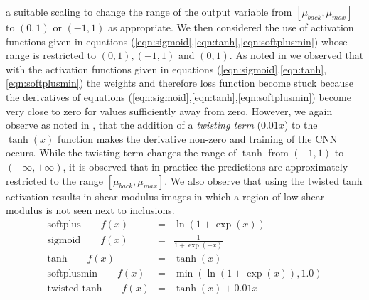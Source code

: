\documentclass[12pt]{article}
\newcommand{\ber}{\begin{eqnarray}}
\newcommand{\eer}{\end{eqnarray}}
\begin{document}
a suitable scaling to change the range of the output variable from $[\mu_{back},\mu_{max}]$ to $(0,1)$ or $(-1,1)$ as appropriate. We then considered the use of activation functions given in equations (\ref{eqn:sigmoid},\ref{eqn:tanh},\ref{eqn:softplusmin}) whose range is restricted to $(0,1),(-1,1)$ and $(0,1)$. As noted in \cite{bookchap:lecun98b} we observed that with the activation functions given in equations (\ref{eqn:sigmoid},\ref{eqn:tanh},\ref{eqn:softplusmin}) the weights and therefore loss function become stuck because the derivatives of equations (\ref{eqn:sigmoid},\ref{eqn:tanh},\ref{eqn:softplusmin}) become very close to zero for values sufficiently away from zero. However, we again observe as noted in \cite{bookchap:lecun98b}, that the addition of a \textit{twisting term} ($0.01x$) to the $\tanh(x)$ function makes the derivative non-zero and training of the CNN occurs. While the twisting term changes the range of $\tanh$ from $(-1,1)$ to $(-\infty,+\infty)$, it is observed that in practice the predictions are approximately restricted to the range $[\mu_{back},\mu_{max}]$. We also observe that using the twisted tanh activation results in shear modulus images in which a region of low shear modulus is not seen next to inclusions.
\begin{subequations}
\ber
\text{softplus}\qquad f(x) &=& \ln(1+\exp(x)) \label{eqn:softplus}\\
\text{sigmoid}\qquad f(x) &=& \frac{1}{1+\exp(-x)}\label{eqn:sigmoid}\\
\text{tanh} \qquad f(x) &=& \tanh(x) \label{eqn:tanh}\\
\text{softplusmin} \qquad f(x) &=& \min(\ln(1+\exp(x)),1.0)\label{eqn:softplusmin} \\
\text{twisted tanh} \qquad f(x) &=& \tanh(x) + 0.01x  \label{eqn:twisttanh}
\eer
\end{subequations}
%
\end{document}
